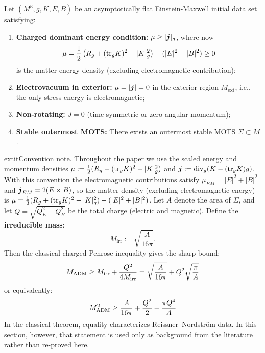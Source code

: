 \begin{theorem}\label{thm:charged-penrose}
Let $(M^3, g, K, E, B)$ be an asymptotically flat Einstein-Maxwell initial data set satisfying:
\begin{enumerate}[label=\textup{(C\arabic*)}]
    \item \textbf{Charged dominant energy condition:} $\mu \geq |\boldsymbol{j}|_g$, where now
    \[
    \mu = \frac{1}{2}\left(R_g + (\mathrm{tr}_g K)^2 - |K|_g^2\right) - (|E|^2 + |B|^2) \geq 0
    \]
    is the matter energy density (excluding electromagnetic contribution);
    \item \textbf{Electrovacuum in exterior:} $\mu = |\boldsymbol{j}| = 0$ in the exterior region $M_{\mathrm{ext}}$, i.e., the only stress-energy is electromagnetic;
    \item \textbf{Non-rotating:} $J = 0$ (time-symmetric or zero angular momentum);
    \item \textbf{Stable outermost MOTS:} There exists an outermost stable MOTS $\Sigma \subset M$.
\end{enumerate}

\medskip
\noindent
	extit{Convention note.} Throughout the paper we use the scaled energy and momentum densities
\(\mu := \tfrac12(R_g + (\mathrm{tr}_g K)^2 - |K|_g^2)\) and \(\boldsymbol{j} := \mathrm{div}_g(K - (\mathrm{tr}_g K)g)\). With this convention the electromagnetic contributions satisfy
\(\mu_{EM} = |E|^2 + |B|^2\) and \(\boldsymbol{j}_{EM} = 2(E\times B)\), so the matter density (excluding electromagnetic energy) is
\(\mu = \tfrac12(R_g + (\mathrm{tr}_g K)^2 - |K|_g^2) - (|E|^2+|B|^2)\).
Let $A$ denote the area of $\Sigma$, and let $Q = \sqrt{Q_E^2 + Q_B^2}$ be the total charge (electric and magnetic). Define the \textbf{irreducible mass}:
\begin{equation}
    M_{\mathrm{irr}} := \sqrt{\frac{A}{16\pi}}.
\end{equation}
Then the classical charged Penrose inequality gives the sharp bound:
\begin{equation}\label{eq:charged-penrose-main}
    M_{\mathrm{ADM}} \geq M_{\mathrm{irr}} + \frac{Q^2}{4M_{\mathrm{irr}}} = \sqrt{\frac{A}{16\pi}} + Q^2\sqrt{\frac{\pi}{A}}
\end{equation}
or equivalently:
\begin{equation}\label{eq:charged-penrose-squared}
    M_{\mathrm{ADM}}^2 \geq \frac{A}{16\pi} + \frac{Q^2}{2} + \frac{\pi Q^4}{A}
\end{equation}
In the classical theorem, equality characterizes Reissner--Nordstr\"om data. In this section, however, that statement is used only as background from the literature rather than re-proved here.
\end{theorem}

